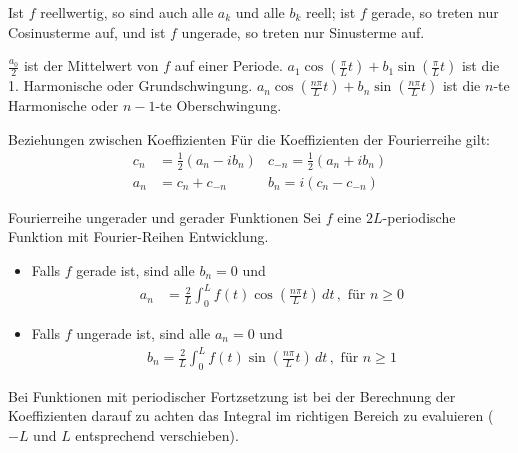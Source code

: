 \documentclass[a4paper,10pt]{article}
\begin{document}
Ist $f$ reellwertig, so sind auch alle $a_k$ und alle $b_k$ reell; ist $f$ gerade, so treten nur Cosinusterme auf, und ist $f$ ungerade, so treten nur Sinusterme auf.

$\frac{a_0}{2}$ ist der Mittelwert von $f$ auf einer Periode. $a_1\cos\left(\frac{\pi}{L}t\right)+b_1\sin\left(\frac{\pi}{L}t\right)$ ist die 1. Harmonische oder Grundschwingung. $a_n\cos\left(\frac{n\pi}{L}t\right)+b_n\sin\left(\frac{n\pi}{L}t\right)$ ist die $n$-te Harmonische oder $n-1$-te Oberschwingung.

\begin{mainbox}{Beziehungen zwischen Koeffizienten}
  Für die Koeffizienten der Fourierreihe gilt:
  \begin{align*} 
    c_n&=\frac{1}{2}(a_n- i b_n) & c_{-n} =\frac{1}{2}(a_n+ i b_n)\\ 
    a_n&=c_n+c_{-n} & b_n = i(c_n-c_{-n})  \end{align*}

\end{mainbox}

\begin{subbox}{Fourierreihe ungerader und gerader Funktionen}
  Sei \(f\) eine \(2L\)-periodische Funktion mit Fourier-Reihen Entwicklung.
  \begin{itemize}
    \item{
      Falls \(f\) gerade ist, sind alle \(b_n=0\) und \begin{align*} a_n&=\frac{2}{L}\int_0^Lf(t)\cos\left(\frac{n\pi}{L}t\right)\,dt\,,\text{ für }n\geq0 \end{align*}
    }
    \item{
      Falls \(f\) ungerade ist, sind alle \(a_n=0\) und \begin{align*} b_n=\frac{2}{L}\int_0^Lf(t)\sin\left(\frac{n\pi}{L}t\right)\,dt\,,\text{ für }n\geq1 \end{align*}
    }
  \end{itemize}

  Bei Funktionen mit periodischer Fortzsetzung ist bei der Berechnung der Koeffizienten darauf zu achten das Integral im richtigen Bereich zu evaluieren ($-L$ und $L$ entsprechend verschieben).
\end{subbox}
\end{document}
